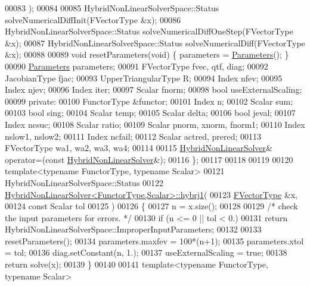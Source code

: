 \begin{DoxyCode}
00083             );
00084 
00085     HybridNonLinearSolverSpace::Status solveNumericalDiffInit(FVectorType  &x);
00086     HybridNonLinearSolverSpace::Status solveNumericalDiffOneStep(FVectorType  &x);
00087     HybridNonLinearSolverSpace::Status solveNumericalDiff(FVectorType  &x);
00088 
00089     \textcolor{keywordtype}{void} resetParameters(\textcolor{keywordtype}{void}) \{ parameters = \hyperlink{struct_eigen_1_1_hybrid_non_linear_solver_1_1_parameters}{Parameters}(); \}
00090     \hyperlink{struct_eigen_1_1_hybrid_non_linear_solver_1_1_parameters}{Parameters} parameters;
00091     FVectorType  fvec, qtf, diag;
00092     JacobianType fjac;
00093     UpperTriangularType R;
00094     Index nfev;
00095     Index njev;
00096     Index iter;
00097     Scalar fnorm;
00098     \textcolor{keywordtype}{bool} useExternalScaling; 
00099 \textcolor{keyword}{private}:
00100     FunctorType &functor;
00101     Index n;
00102     Scalar sum;
00103     \textcolor{keywordtype}{bool} sing;
00104     Scalar temp;
00105     Scalar delta;
00106     \textcolor{keywordtype}{bool} jeval;
00107     Index ncsuc;
00108     Scalar ratio;
00109     Scalar pnorm, xnorm, fnorm1;
00110     Index nslow1, nslow2;
00111     Index ncfail;
00112     Scalar actred, prered;
00113     FVectorType wa1, wa2, wa3, wa4;
00114 
00115     \hyperlink{class_eigen_1_1_hybrid_non_linear_solver}{HybridNonLinearSolver}& operator=(\textcolor{keyword}{const} 
      \hyperlink{class_eigen_1_1_hybrid_non_linear_solver}{HybridNonLinearSolver}&);
00116 \};
00117 
00118 
00119 
00120 \textcolor{keyword}{template}<\textcolor{keyword}{typename} FunctorType, \textcolor{keyword}{typename} Scalar>
00121 HybridNonLinearSolverSpace::Status
00122 \hyperlink{class_eigen_1_1_hybrid_non_linear_solver}{HybridNonLinearSolver<FunctorType,Scalar>::hybrj1}(
00123         \hyperlink{group___core___module}{FVectorType}  &x,
00124         \textcolor{keyword}{const} Scalar tol
00125         )
00126 \{
00127     n = x.size();
00128 
00129     \textcolor{comment}{/* check the input parameters for errors. */}
00130     \textcolor{keywordflow}{if} (n <= 0 || tol < 0.)
00131         \textcolor{keywordflow}{return} HybridNonLinearSolverSpace::ImproperInputParameters;
00132 
00133     resetParameters();
00134     parameters.maxfev = 100*(n+1);
00135     parameters.xtol = tol;
00136     diag.setConstant(n, 1.);
00137     useExternalScaling = \textcolor{keyword}{true};
00138     \textcolor{keywordflow}{return} solve(x);
00139 \}
00140 
00141 \textcolor{keyword}{template}<\textcolor{keyword}{typename} FunctorType, \textcolor{keyword}{typename} Scalar>

\end{DoxyCode}
